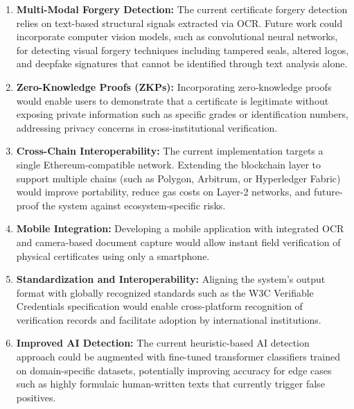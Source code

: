 {\begin{enumerate}
    \item \textbf{Multi-Modal Forgery Detection:} The current certificate forgery detection relies on text-based structural signals extracted via OCR. Future work could incorporate computer vision models, such as convolutional neural networks, for detecting visual forgery techniques including tampered seals, altered logos, and deepfake signatures that cannot be identified through text analysis alone.

    \item \textbf{Zero-Knowledge Proofs (ZKPs):} Incorporating zero-knowledge proofs would enable users to demonstrate that a certificate is legitimate without exposing private information such as specific grades or identification numbers, addressing privacy concerns in cross-institutional verification.

    \item \textbf{Cross-Chain Interoperability:} The current implementation targets a single Ethereum-compatible network. Extending the blockchain layer to support multiple chains (such as Polygon, Arbitrum, or Hyperledger Fabric) would improve portability, reduce gas costs on Layer-2 networks, and future-proof the system against ecosystem-specific risks.

    \item \textbf{Mobile Integration:} Developing a mobile application with integrated OCR and camera-based document capture would allow instant field verification of physical certificates using only a smartphone.

    \item \textbf{Standardization and Interoperability:} Aligning the system's output format with globally recognized standards such as the W3C Verifiable Credentials specification would enable cross-platform recognition of verification records and facilitate adoption by international institutions.

    \item \textbf{Improved AI Detection:} The current heuristic-based AI detection approach could be augmented with fine-tuned transformer classifiers trained on domain-specific datasets, potentially improving accuracy for edge cases such as highly formulaic human-written texts that currently trigger false positives.
\end{enumerate}
}